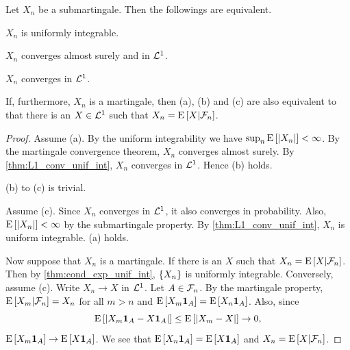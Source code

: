 \begin{theorem}\label{thm:martingale_L1_unif_int}
    Let $X_n$ be a submartingale. Then the followings are equivalent.
    \begin{thmenum}
        \item $X_n$ is uniformly integrable. 
        \item $X_n$ converges almost surely and in $\mathcal{L}^1$. 
        \item $X_n$ converges in $\mathcal{L}^1$. 
    \end{thmenum}
    If, furthermore, $X_n$ is a martingale, then (a), (b) and (c) are also equivalent 
    to that there is an $X\in\mathcal{L}^1$ such that $X_n = \operatorname{E}\left[ {X|\mathcal{F}_n} \right]$. 
\end{theorem}
\begin{proof}
    Assume (a). By the uniform integrability we have $\sup_n\operatorname{E}\left[ {\left\lvert {X_n} \right\rvert} \right]<\infty$. 
    By the martingale convergence theorem, $X_n$ converges almost surely. By 
    \cref{thm:L1_conv_unif_int}, $X_n$ converges in $\mathcal{L}^1$. Hence (b) holds. 

    (b) to (c) is trivial. 
    
    Assume (c). Since $X_n$ converges in $\mathcal{L}^1$, it also converges in probability. 
    Also, $\operatorname{E}\left[ {\left\lvert {X_n} \right\rvert} \right]<\infty$ by the submartingale property. By 
    \cref{thm:L1_conv_unif_int}, $X_n$ is uniform integrable. (a) holds. 
    
    Now suppose that $X_n$ is a martingale. If there is an $X$ such that 
    $X_n = \operatorname{E}\left[ {X|\mathcal{F}_n} \right]$. Then by \cref{thm:cond_exp_unif_int}, $\left\{ {X_n} \right\}$ 
    is uniformly integrable. Conversely, assume (c). Write $X_n\to X$ in $\mathcal{L}^1$. 
    Let $A\in\mathcal{F}_n$. By the martingale property, $\operatorname{E}\left[ {X_m|\mathcal{F}_n} \right] = X_n$ for all 
    $m>n$ and $\operatorname{E}\left[ {X_m\mathbf{1}_A} \right] = \operatorname{E}\left[ {X_n\mathbf{1}_A} \right]$. Also, since 
    \begin{equation*}
        \operatorname{E}\left[ {\left\lvert {X_m\mathbf{1}_A-X\mathbf{1}_A} \right\rvert} \right]\leq \operatorname{E}\left[ {\left\lvert {X_m-X} \right\rvert} \right]\to 0, 
    \end{equation*}
    $\operatorname{E}\left[ {X_m\mathbf{1}_A} \right]\to \operatorname{E}\left[ {X\mathbf{1}_A} \right]$. We see that $\operatorname{E}\left[ {X_n\mathbf{1}_A} \right] = \operatorname{E}\left[ {X\mathbf{1}_A} \right]$ 
    and $X_n = \operatorname{E}\left[ {X|\mathcal{F}_n} \right]$. 
\end{proof}

